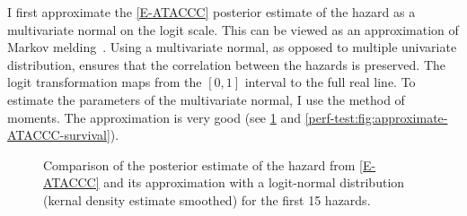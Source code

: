 \documentclass[thesis.tex]{subfiles}
\begin{document}
I first approximate the \cref{E-ATACCC} posterior estimate of the hazard as a multivariate normal on the logit scale.
This can be viewed as an approximation of Markov melding~\autocite{goudieJoining}.
Using a multivariate normal, as opposed to multiple univariate distribution, ensures that the correlation between the hazards is preserved.
The logit transformation maps from the $[0, 1]$ interval to the full real line.
To estimate the parameters of the multivariate normal, I use the method of moments.
The approximation is very good (see \cref{perf-test:fig:approximate-ATACCC-hazard} and \cref{perf-test:fig:approximate-ATACCC-survival}).
\begin{figure}
  \vspace{-2.5cm}
  \caption[Approximating the ATACCC posterior hazard as a logit-normal]{Comparison of the posterior estimate of the hazard from \cref{E-ATACCC} and its approximation with a logit-normal distribution (kernal density estimate smoothed) for the first 15 hazards. \label{perf-test:fig:approximate-ATACCC-hazard}}
\end{figure}
\end{document}
